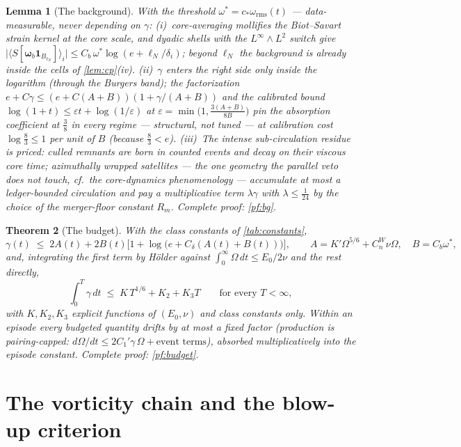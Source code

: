 \documentclass[11pt,letterpaper]{amsart}
\newtheorem{theorem}{Theorem}[section]
\newtheorem{lemma}[theorem]{Lemma}
\theoremstyle{definition}
\theoremstyle{remark}
\newcommand{\om}{\omega}
\newcommand{\vort}{\boldsymbol{\omega}}
\newcommand{\abs}[1]{\lvert #1 \rvert}
\begin{document}
\begin{lemma}[The background]\label{lem:bg}
With the threshold $\om^*=c_*\om_{\mathrm{rms}}(t)$ --- data-measurable, never
depending on $\gamma$: \textup{(i)}~core-averaging mollifies the Biot--Savart strain
kernel at the core scale, and dyadic shells with the $L^\infty\wedge L^2$ switch give
$\abs{\langle S[\vort_b\mathbf{1}_{B_{\ell_N}}]\rangle_i}\le
C_b\,\om^*\log(e+\ell_N/\delta_i)$; beyond $\ell_N$ the background is already inside
the cells of \cref{lem:cp}(iv). \textup{(ii)}~$\gamma$ enters the right side only
inside the logarithm (through the Burgers band); the factorization
$e+C\gamma\le(e+C(A+B))(1+\gamma/(A+B))$ and the calibrated bound
$\log(1+t)\le\varepsilon t+\log(1/\varepsilon)$ at
$\varepsilon=\min\bigl(1,\tfrac{3(A+B)}{8B}\bigr)$ pin the absorption
coefficient at $\tfrac38$ in every regime --- structural, not tuned --- at
calibration cost $\log\tfrac83\le1$ per unit of $B$ (because $\tfrac83<e$). \textup{(iii)}~The intense
sub-circulation residue is priced: culled remnants are born in counted events and
decay on their viscous core time; azimuthally wrapped satellites --- the one geometry
the parallel veto does not touch, cf.\ the core-dynamics phenomenology
\cite{MelanderHussain1994} --- accumulate at most a ledger-bounded circulation and pay
a multiplicative term $\lambda\gamma$ with $\lambda\le\tfrac1{24}$ by the choice of the
merger-floor constant $R_m$. Complete proof: \cref{pf:bg}.
\end{lemma}

\begin{theorem}[The budget]\label{thm:budget}
With the class constants of \cref{tab:constants},
\[
\gamma(t)\;\le\;2A(t)+2B(t)\bigl[1+\log\bigl(e+C_\delta(A(t)+B(t))\bigr)\bigr],
\qquad A=K'\Omega^{5/6}+C_n^{W}\nu\Omega,\quad B=C_b\om^*,
\]
and, integrating the first term by H\"older against
$\int_0^\infty\Omega\,dt\le E_0/2\nu$ and the rest directly,
\[
\int_0^T\gamma\,dt\;\le\;K\,T^{1/6}+K_2+K_3T
\qquad\text{for every }T<\infty,
\]
with $K,K_2,K_3$ explicit functions of $(E_0,\nu)$ and class constants only. Within an
episode every budgeted quantity drifts by at most a fixed factor (production is
pairing-capped: $d\Omega/dt\le2C_1'\gamma\,\Omega+\text{event terms}$), absorbed
multiplicatively into the episode constant. Complete proof: \cref{pf:budget}.
\end{theorem}

\section{The vorticity chain and the blow-up criterion}\label{sec:chain}
\end{document}

